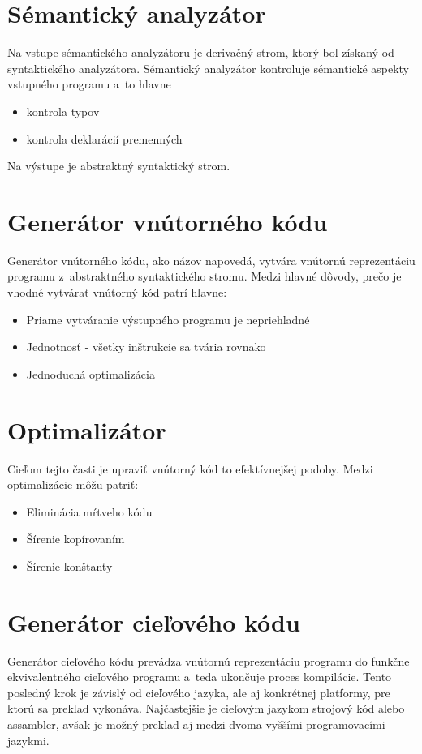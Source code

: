 \section{Sémantický analyzátor}
Na vstupe sémantického analyzátoru je derivačný strom, ktorý bol získaný od
syntaktického analyzátora. Sémantický analyzátor kontroluje sémantické aspekty
vstupného programu a~to hlavne 
\begin{itemize}
    \item kontrola typov
    \item kontrola deklarácií premenných
\end{itemize}
Na výstupe je abstraktný syntaktický strom.

\section{Generátor vnútorného kódu}
Generátor vnútorného kódu, ako názov napovedá, vytvára vnútornú reprezentáciu programu
z~abstraktného syntaktického stromu. Medzi hlavné dôvody, prečo je vhodné
vytvárať vnútorný kód patrí hlavne:
\begin{itemize}
    \item Priame vytváranie výstupného programu je nepriehľadné
    \item Jednotnosť - všetky inštrukcie sa tvária rovnako
    \item Jednoduchá optimalizácia
\end{itemize}

\section{Optimalizátor}
Cieľom tejto časti je upraviť vnútorný kód to efektívnejšej podoby.
Medzi optimalizácie môžu patriť:
\begin{itemize}
    \item Eliminácia mŕtveho kódu
    \item Šírenie kopírovaním
    \item Šírenie konštanty
\end{itemize}

\section{Generátor cieľového kódu}
Generátor cieľového kódu prevádza vnútornú reprezentáciu programu do funkčne ekvivalentného cieľového programu a~teda ukončuje proces kompilácie. Tento posledný krok je závislý od cieľového jazyka, ale aj konkrétnej platformy, pre ktorú sa preklad vykonáva. Najčastejšie je cieľovým jazykom strojový kód alebo assambler, avšak je možný preklad aj medzi dvoma vyššími programovacími jazykmi\cite{meduna}. 

